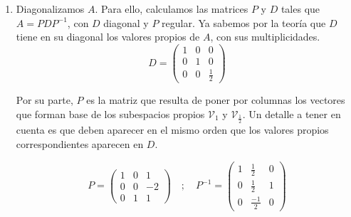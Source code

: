 \documentclass[11pt, a4paper]{article}
\newif\IfInSansMode
\numberwithin{equation}{section}
\theoremstyle{theorem-style}
\theoremstyle{definition-style}
\theoremstyle{remark-style}
\theoremstyle{example-style}
\newenvironment{nlist}
{\begin{enumerate}
    \renewcommand\labelenumi{(\emph{\roman{enumi})}}}
  {\end{enumerate}}
\begin{document}
\begin{nlist}
  Ahora, calculamos una base del subespacio propio restante:

  $$\left(A - \frac{1}{2}I\right)v = 0 \implies 
  \begin{pmatrix}
    \frac{1}{2} & \frac{1}{4} & 0 \\
    0 & 0 & 0 \\
    0 & \frac{1}{4} & \frac{1}{2}
  \end{pmatrix}
  \begin{pmatrix}
    v_1 \\
    v_2 \\
    v_3
  \end{pmatrix} =
  \begin{pmatrix}
    0 \\ 
    0 \\
    0
  \end{pmatrix} \Rightarrow
  \begin{cases}
    \frac{1}{2}v_1 + \frac{1}{4}v_2 = 0 \\
    \frac{1}{4}v_2 + \frac{1}{2}v_3 = 0
  \end{cases} \Rightarrow
  \begin{cases}
    2v_1 = -v_2 \\
    v_1 = v_3
  \end{cases}$$

  Luego, $\mathcal V_{\lambda_2} = \mathcal V_{\frac{1}{2}} = \{ v \in \mathbb C^3 : v_1 = v_3,\ 2v_1 = -v_2 \} =
  \langle\
  \begin{pmatrix}
    1 \\
    -2 \\
    1
  \end{pmatrix}\ \rangle$.

\item Diagonalizamos $A$. Para ello, calculamos las matrices $P$ y $D$ tales que $A = PDP^{-1}$, con $D$ diagonal y $P$ regular. Ya sabemos por la teoría que $D$ tiene en su diagonal los valores propios de $A$, con sus multiplicidades.
$$D =
\begin{pmatrix}
  1 & 0 & 0 \\
  0 & 1 & 0 \\
  0 & 0 & \frac{1}{2} 
\end{pmatrix}$$

Por su parte, $P$ es la matriz que resulta de poner por columnas los vectores que forman base de los subespacios propios $\mathcal V_1$ y $\mathcal V_{\frac{1}{2}}$. Un detalle a tener en cuenta es que deben aparecer en el mismo orden que los valores propios correspondientes aparecen en $D$.

$$P =
\begin{pmatrix}
  1 & 0 & 1 \\
  0 & 0 & -2 \\
  0 & 1 & 1
\end{pmatrix} \quad ; \quad P^{-1} =
\begin{pmatrix}
  1 & \frac{1}{2} & 0 \\
  0 & \frac{1}{2} & 1 \\
  0 & \frac{-1}{2} & 0
\end{pmatrix}$$
\end{nlist}
\end{document}
